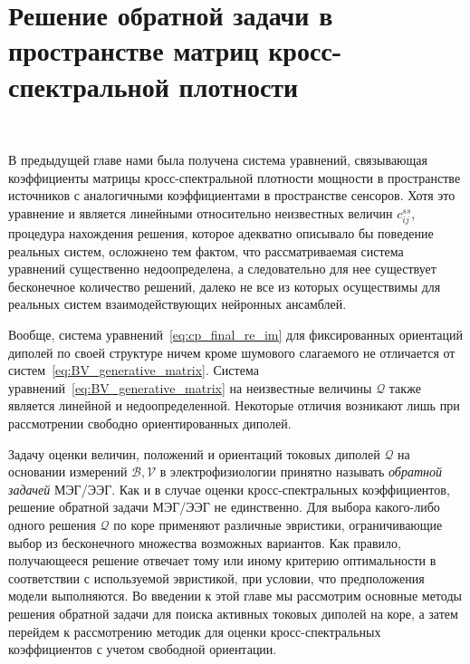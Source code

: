 \chapter{Решение обратной задачи в пространстве матриц кросс-спектральной плотности}~\label{chapt2}



В предыдущей главе нами была получена система уравнений, связывающая
коэффициенты матрицы кросс-спектральной плотности мощности в пространстве
источников с аналогичными коэффициентами в пространстве сенсоров. Хотя это
уравнение и является линейными относительно неизвестных величин $c_{ij}^{ss}$,
процедура нахождения решения, которое адекватно описывало бы поведение реальных
систем, осложнено тем фактом, что рассматриваемая система уравнений существенно
недоопределена, а следовательно для нее существует бесконечное количество
решений, далеко не все из которых осуществимы для реальных систем
взаимодействующих нейронных ансамблей.

Вообще, система уравнений~\ref{eq:cp_final_re_im} для фиксированных ориентаций
диполей по своей структуре ничем кроме шумового слагаемого не отличается от
систем~\ref{eq:BV_generative_matrix}.
Система уравнений~\ref{eq:BV_generative_matrix} на неизвестные величины $\mathcal{Q}$ также
является линейной и недоопределенной. Некоторые отличия возникают лишь при
рассмотрении свободно ориентированных диполей.

Задачу оценки величин, положений и ориентаций токовых диполей $\mathcal{Q}$ на
основании измерений $\mathcal{B}, \mathcal{V}$ в электрофизиологии принятно
называть \emph{обратной задачей} МЭГ/ЭЭГ.  Как и в случае оценки
кросс-спектральных коэффициентов, решение обратной задачи МЭГ/ЭЭГ не
единственно.  Для выбора какого-либо одного решения $\mathcal{Q}$ по коре
применяют различные эвристики, ограничивающие выбор из бесконечного множества
возможных вариантов.  Как правило, получающееся решение отвечает тому или иному
критерию оптимальности в соответствии с используемой эвристикой, при условии,
что предположения модели выполняются.  Во введении к этой главе мы рассмотрим
основные методы решения обратной задачи для поиска активных токовых диполей на
коре, а затем перейдем к рассмотрению методик для оценки кросс-спектральных
коэффициентов с учетом свободной ориентации.

